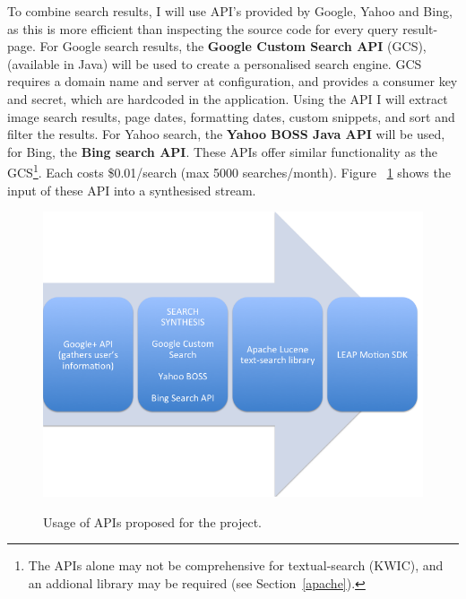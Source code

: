 \documentclass[a4paper, 11pt]{article}
\begin{document}
\begin{justify}
To combine search results, I will use API’s provided by Google, Yahoo and Bing, as this is more efficient than inspecting the source code for every query result-page. For Google search results, the \textbf{Google Custom Search API} (GCS), (available in Java) will be used to create a personalised search engine. GCS requires a domain name and server at configuration, and provides a consumer key and secret, which are hardcoded in the application. Using the API I will extract image search results, page dates, formatting dates, custom snippets, and sort and filter the results. For Yahoo search, the \textbf{Yahoo BOSS Java API} will be used, for Bing, the \textbf{Bing search API}. These APIs offer similar functionality as the GCS\footnote{The APIs alone may not be comprehensive for textual-search (KWIC), and an addional library may be required (see Section~\ref{apache}).}. Each costs \$0.01/search (max 5000 searches/month). Figure ~\ref{apistream} shows the input of these API into a synthesised stream.

\begin{figure}[H]
\begin{center}
\includegraphics[scale=0.3]{apistream}\\
\caption{Usage of APIs proposed for the project.}
\label{apistream}
\end{center}
\end{figure}


\end{justify}
\end{document}
